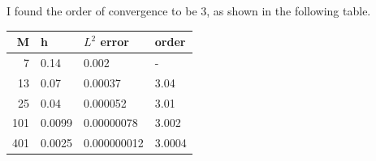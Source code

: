 \documentclass[11pt, titlepage]{article}
\begin{document}
\begin{enumerate}
\begin{enumerate}
        I found the order of convergence to be 3, as shown in the following table.
        \begin{center}
          \begin{tabular}{rlll}
            \toprule
              M & h & $L^2$ error & order \\
            \midrule
                7 &   0.14 & 0.002       & - \\
               13 &   0.07 & 0.00037     & 3.04 \\
               25 &   0.04 & 0.000052    & 3.01 \\
              101 & 0.0099 & 0.00000078  & 3.002 \\
              401 & 0.0025 & 0.000000012 & 3.0004 \\
            \bottomrule
          \end{tabular}
        \end{center}

    \end{enumerate}
\end{enumerate}
\end{document}
